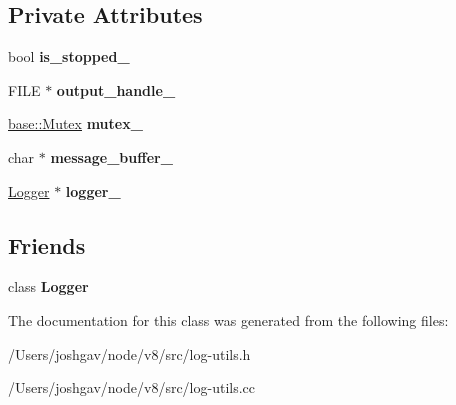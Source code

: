 \subsection*{Private Attributes}
\begin{DoxyCompactItemize}
\item 
bool {\bfseries is\+\_\+stopped\+\_\+}\hypertarget{classv8_1_1internal_1_1_log_ab4ab4229783c78b4d05664632b947bf8}{}\label{classv8_1_1internal_1_1_log_ab4ab4229783c78b4d05664632b947bf8}

\item 
F\+I\+LE $\ast$ {\bfseries output\+\_\+handle\+\_\+}\hypertarget{classv8_1_1internal_1_1_log_a3e1910eaa84528557714301fcc6eb38d}{}\label{classv8_1_1internal_1_1_log_a3e1910eaa84528557714301fcc6eb38d}

\item 
\hyperlink{classv8_1_1base_1_1_mutex}{base\+::\+Mutex} {\bfseries mutex\+\_\+}\hypertarget{classv8_1_1internal_1_1_log_aceb75cf8c09b5c38fea77ffdc2d67cb2}{}\label{classv8_1_1internal_1_1_log_aceb75cf8c09b5c38fea77ffdc2d67cb2}

\item 
char $\ast$ {\bfseries message\+\_\+buffer\+\_\+}\hypertarget{classv8_1_1internal_1_1_log_a91a40ae658c8ba105fac2609305003aa}{}\label{classv8_1_1internal_1_1_log_a91a40ae658c8ba105fac2609305003aa}

\item 
\hyperlink{classv8_1_1internal_1_1_logger}{Logger} $\ast$ {\bfseries logger\+\_\+}\hypertarget{classv8_1_1internal_1_1_log_a2cb3974649111a2125b9f40a7360b507}{}\label{classv8_1_1internal_1_1_log_a2cb3974649111a2125b9f40a7360b507}

\end{DoxyCompactItemize}
\subsection*{Friends}
\begin{DoxyCompactItemize}
\item 
class {\bfseries Logger}\hypertarget{classv8_1_1internal_1_1_log_aff02b76416d2846736b7ecd798921a0a}{}\label{classv8_1_1internal_1_1_log_aff02b76416d2846736b7ecd798921a0a}

\end{DoxyCompactItemize}


The documentation for this class was generated from the following files\+:\begin{DoxyCompactItemize}
\item 
/\+Users/joshgav/node/v8/src/log-\/utils.\+h\item 
/\+Users/joshgav/node/v8/src/log-\/utils.\+cc\end{DoxyCompactItemize}
